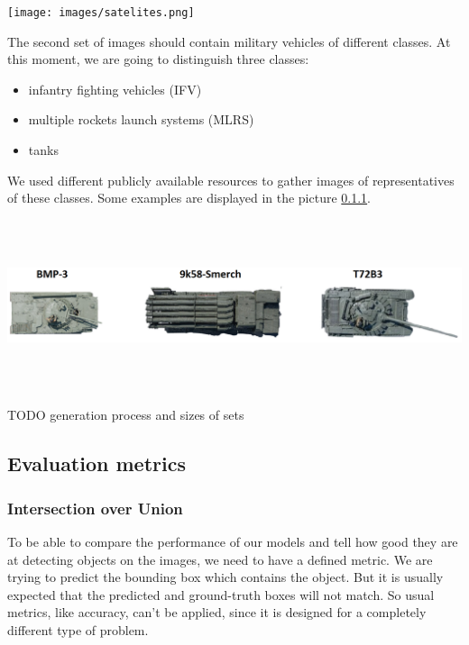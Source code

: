 \documentclass[14pt,a4paper]{extarticle}
\newcounter{e}
\newcounter{pic}
\numberwithin{equation}{section}
\numberwithin{figure}{section}
\begin{document}
\begin{center}
    \texttt{[image: images/satelites.png]}
\end{center}


The second set of images should contain military vehicles of different classes. At this moment, we are going to distinguish three classes:
\begin{itemize}
    \item infantry fighting vehicles (IFV)
    \item multiple rockets launch systems (MLRS) 
    \item tanks
\end{itemize}

We used different publicly available resources to gather images of representatives of these classes. Some examples are displayed in the picture \ref{}.

\begin{center}
    \includegraphics[height=5cm]{images/military-vehicles.png}
\end{center}


TODO generation process and sizes of sets



\newpage
    \subsection{Evaluation metrics}
        \subsubsection{Intersection over Union}
To be able to compare the performance of our models and tell how good they are at detecting objects on the images, we need to have a defined metric.
We are trying to predict the bounding box which contains the object. But it is usually expected that the predicted and ground-truth boxes will not match. So usual metrics, like accuracy, can't be applied, since it is designed for a completely different type of problem.
\end{document}
